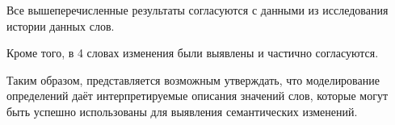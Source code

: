 \documentclass[LI,VKR]{HSEUniversity}
\begin{document}
Все вышеперечисленные результаты согласуются с данными из исследования истории данных слов.

Кроме того, в 4 словах изменения были выявлены и частично согласуются.

Таким образом, представляется возможным утверждать, что моделирование определений даёт
интерпретируемые описания значений слов, которые могут быть успешно использованы
для выявления семантических изменений.

%
%
%

\end{document}
